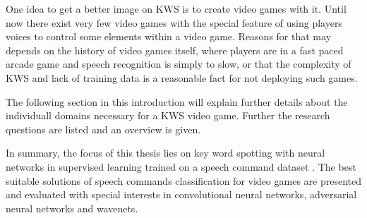 One idea to get a better image on KWS is to create video games with it.
Until now there exist very few video games with the special feature of using players voices to control some elements within a video game.
Reasons for that may depends on the history of video games itself, where players are in a fast paced arcade game and speech recognition is simply to slow, or that the complexity of KWS and lack of training data is a reasonable fact for not deploying such games.

The following section in this introduction will explain further details about the individuall domains necessary for a KWS video game. 
Further the research questions are listed and an overview is given.

In summary, the focus of this thesis lies on key word spotting with neural networks in supervised learning trained on a speech command dataset \cite{Warden2018}.
The best suitable solutions of speech commands classification for video games are presented and evaluated with special interests in convolutional neural networks, adversarial neural networks and wavenets.




\newpage










